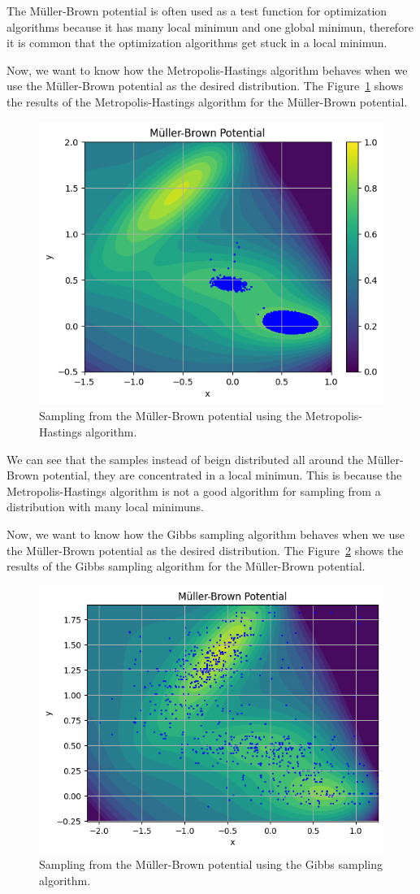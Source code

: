 \documentclass{article}
\begin{document}
The Müller-Brown potential is often used as a test function for optimization algorithms because it has many local minimun and one global minimun, therefore it is common that the optimization algorithms get stuck in a local minimun.


Now, we want to know how the Metropolis-Hastings algorithm behaves when we use the Müller-Brown potential as the desired distribution. The Figure~\ref{fig:mullerbrownmh} shows the results of the Metropolis-Hastings algorithm for the Müller-Brown potential.

\begin{figure}[H]
	\centering
	\includegraphics[width=0.5\linewidth]{./Figures/MCMC/mullerbrownmh.png}
	\caption{Sampling from the Müller-Brown potential using the Metropolis-Hastings algorithm.}
	\label{fig:mullerbrownmh}
\end{figure}

We can see that the samples instead of beign distributed all around the Müller-Brown potential, they are concentrated in a local minimun. This is because the Metropolis-Hastings algorithm is not a good algorithm for sampling from a distribution with many local minimuns.


Now, we want to know how the Gibbs sampling algorithm behaves when we use the Müller-Brown potential as the desired distribution. The Figure~\ref{fig:mullerbrowngibbs} shows the results of the Gibbs sampling algorithm for the Müller-Brown potential.

\begin{figure}[H]
	\centering
	\includegraphics[width=0.5\linewidth]{./Figures/MCMC/mullerbrowngibbs.png}
	\caption{Sampling from the Müller-Brown potential using the Gibbs sampling algorithm.}
	\label{fig:mullerbrowngibbs}
\end{figure}
\end{document}
